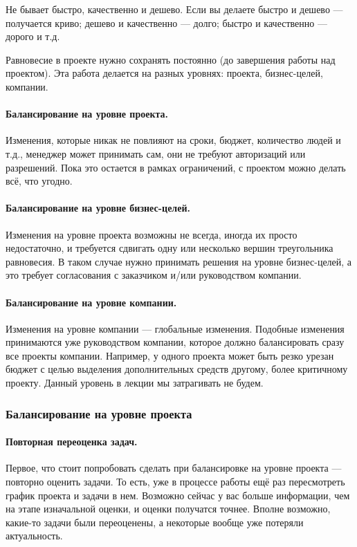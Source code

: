 \documentclass{../../text-style}
\begin{document}
Не бывает быстро, качественно и дешево. Если вы делаете быстро и дешево --- получается криво; дешево и качественно --- долго; быстро и качественно --- дорого и т.д.

Равновесие в проекте нужно сохранять постоянно (до завершения работы над проектом). Эта работа делается на разных уровнях: проекта, бизнес-целей, компании.

\paragraph{Балансирование на уровне проекта.} Изменения, которые никак не повлияют на сроки, бюджет, количество людей и т.д., менеджер может принимать сам, они не требуют авторизаций или разрешений. Пока это остается в рамках ограничений, с проектом можно делать всё, что угодно.

\paragraph{Балансирование на уровне бизнес-целей.} Изменения на уровне проекта возможны не всегда, иногда их просто недостаточно, и требуется сдвигать одну или несколько вершин треугольника равновесия. В таком случае нужно принимать решения на уровне бизнес-целей, а это требует согласования с заказчиком и/или руководством компании.

\paragraph{Балансирование на уровне компании.} Изменения на уровне компании --- глобальные изменения. Подобные изменения принимаются уже руководством компании, которое должно балансировать сразу все проекты компании. Например, у одного проекта может быть резко урезан бюджет с целью выделения дополнительных средств другому, более критичному проекту. Данный уровень в лекции мы затрагивать не будем.

\subsubsection{Балансирование на уровне проекта}

\paragraph{Повторная переоценка задач.} Первое, что стоит попробовать сделать при балансировке на уровне проекта --- повторно оценить задачи. То есть, уже в процессе работы ещё раз пересмотреть график проекта и задачи в нем. Возможно сейчас у вас больше информации, чем на этапе изначальной оценки, и оценки получатся точнее. Вполне возможно, какие-то задачи были переоценены, а некоторые вообще уже потеряли актуальность.
\end{document}
